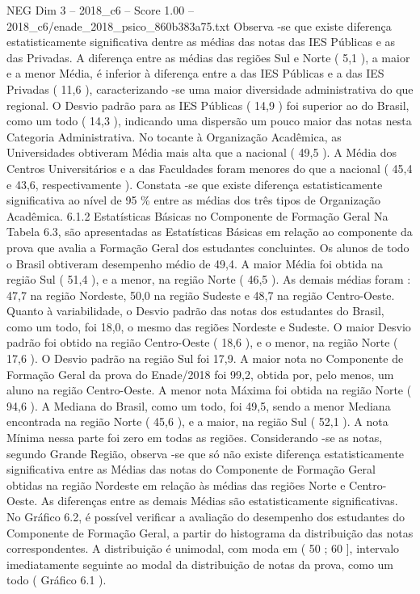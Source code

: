 \begin{textsample}{NEG Dim 3 – 2018\_c6 – Score 1.00 – 2018\_c6/enade\_2018\_psico\_860b383a75.txt}
Observa -se que existe diferença estatisticamente significativa dentre as médias das notas das IES Públicas e as das Privadas.
A diferença entre as médias das regiões Sul e Norte ( 5,1 ), a maior e a menor Média, é inferior à diferença entre a das IES Públicas e a das IES Privadas ( 11,6 ), caracterizando -se uma maior diversidade administrativa do que regional.
O Desvio padrão para as IES Públicas ( 14,9 ) foi superior ao do Brasil, como um todo ( 14,3 ), indicando uma dispersão um pouco maior das notas nesta Categoria Administrativa.
No tocante à Organização Acadêmica, as Universidades obtiveram Média mais alta que a nacional ( 49,5 ).
A Média dos Centros Universitários e a das Faculdades foram menores do que a nacional ( 45,4 e 43,6, respectivamente ).
Constata -se que existe diferença estatisticamente significativa ao nível de 95 \% entre as médias dos três tipos de Organização Acadêmica. 6.1.2 Estatísticas Básicas no Componente de Formação Geral Na Tabela 6.3, são apresentadas as Estatísticas Básicas em relação ao componente da prova que avalia a Formação Geral dos estudantes concluintes.
Os alunos de todo o Brasil obtiveram desempenho médio de 49,4.
A maior Média foi obtida na região Sul ( 51,4 ), e a menor, na região Norte ( 46,5 ).
As demais médias foram : 47,7 na região Nordeste, 50,0 na região Sudeste e 48,7 na região Centro-Oeste.
Quanto à variabilidade, o Desvio padrão das notas dos estudantes do Brasil, como um todo, foi 18,0, o mesmo das regiões Nordeste e Sudeste.
O maior Desvio padrão foi obtido na região Centro-Oeste ( 18,6 ), e o menor, na região Norte ( 17,6 ).
O Desvio padrão na região Sul foi 17,9.
A maior nota no Componente de Formação Geral da prova do Enade/2018 foi 99,2, obtida por, pelo menos, um aluno na região Centro-Oeste.
A menor nota Máxima foi obtida na região Norte ( 94,6 ).
A Mediana do Brasil, como um todo, foi 49,5, sendo a menor Mediana encontrada na região Norte ( 45,6 ), e a maior, na região Sul ( 52,1 ).
A nota Mínima nessa parte foi zero em todas as regiões.
Considerando -se as notas, segundo Grande Região, observa -se que só não existe diferença estatisticamente significativa entre as Médias das notas do Componente de Formação Geral obtidas na região Nordeste em relação às médias das regiões Norte e Centro-Oeste.
As diferenças entre as demais Médias são estatisticamente significativas.
No Gráfico 6.2, é possível verificar a avaliação do desempenho dos estudantes do Componente de Formação Geral, a partir do histograma da distribuição das notas correspondentes.
A distribuição é unimodal, com moda em ( 50 ; 60 ], intervalo imediatamente seguinte ao modal da distribuição de notas da prova, como um todo ( Gráfico 6.1 ).

\end{textsample}
